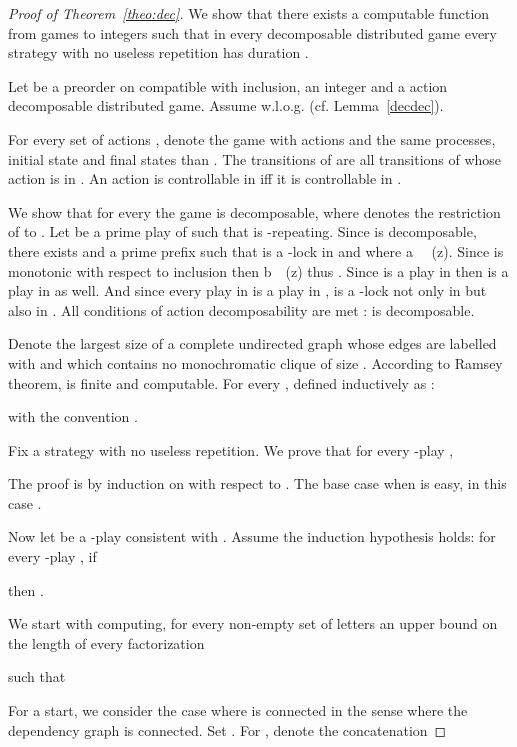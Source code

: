 \documentclass[a4paper,UKenglish]{lipics-v2016}
\newcommand{\ind}{~\mathbb{I}~}
\DeclareMathOperator{\last}{last}
\begin{document}
\begin{proof}[Proof of Theorem~\ref{theo:dec}]
\newcommand{\CC}{\mathcal{C}}

We show that there exists a computable function 
from games to integers
such that in every decomposable distributed game 
every strategy with no useless repetition
has duration .

Let  be a preorder on  compatible with inclusion,
 an integer and 
 a  action decomposable distributed game.
Assume  w.l.o.g. (cf. Lemma~\ref{decdec}).

For every set of actions ,
denote  the game with  actions 
and the same processes, initial state and final states than .
The transitions of  are all transitions of  whose
 action is in . An action  is controllable in  iff it is controllable in .


We show that for every  the game  is  decomposable,
where  denotes the restriction of  to . Let  be a prime play of  
such that  is -repeating.
Since   is  decomposable, there exists
 and a prime prefix 
such that  is a  -lock in 
and 
where
a \ind \last(z).
Since  is monotonic with respect to inclusion
 then b\ind \last(z)
 thus
 .
 Since  is a play in  then  is a play in  as well.
 And since every play in  is a play in ,  is a  -lock not only in  but also in .
All conditions of action decomposability are met :
   is  decomposable.


\medskip

Denote   the largest size of a complete undirected graph whose edges are labelled with  
and which contains no monochromatic clique of size .
According to Ramsey theorem,
 is finite and computable. 
For every ,
defined inductively  as
:

with the convention .

Fix a strategy  with no useless repetition.
We prove that for every  -play ,

The proof is by induction on  with respect to .
The base case when 
is easy, in this case
.


Now let  be a -play consistent with .
Assume the induction hypothesis holds: for every -play , if

then
 . 
 
 We start with computing,
for every non-empty set of letters  
an upper bound on the length of every factorization

such that

For a start, we consider the case where  is connected in the sense
where the dependency graph  is connected.
Set .
For ,
denote 
 the concatenation


\end{proof}
\end{document}
